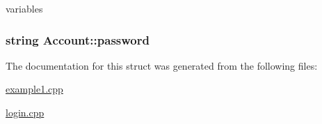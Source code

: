variables 

\hypertarget{struct_account_a7b92d220d2b749d91db2a39fc51ab0a2}{
\subsubsection[{password}]{\setlength{\rightskip}{0pt plus 5cm}string Account\+::password}}\label{struct_account_a7b92d220d2b749d91db2a39fc51ab0a2}


The documentation for this struct was generated from the following files\+:\begin{DoxyCompactItemize}
\item 
\hyperlink{example1_8cpp}{example1.\+cpp}\item 
\hyperlink{login_8cpp}{login.\+cpp}\end{DoxyCompactItemize}
